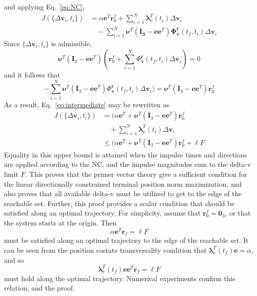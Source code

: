 \documentclass[letterpaper, 10 pt, conference]{ieeeconf}  %
\begin{document}
and applying Eq.~\eqref{eq:NC}, \begin{align}J(\{\Delta \boldsymbol{v}_i, t_i\}) &=  \alpha \boldsymbol{e}^T\boldsymbol{r}_0^f + \sum_{i = 1}^N \boldsymbol{\lambda}_v^T(t_i) \Delta \boldsymbol{v}_i \nonumber \\ &\quad - \sum_{i=1}^N \boldsymbol{\nu}^T(\boldsymbol{I_3} - \boldsymbol{e}\boldsymbol{e}^T)\boldsymbol{\Phi_v^r}(t_f, t_i) \Delta \boldsymbol{v}_i \label{eq:intermediate} \end{align} Since $\{\Delta \boldsymbol{v}_i, t_i \}$ is admissible, \[ \boldsymbol{\nu}^T(\boldsymbol{I}_3 - \boldsymbol{e}\boldsymbol{e}^T)(\boldsymbol{r}_0^f +\sum_{i=1}^N \Phi_{\boldsymbol{v}}^{\boldsymbol{r}}(t_f, t_i) \Delta \boldsymbol{v}_i )= 0    \] and it follows that \[ -\sum_{i=1}^N \boldsymbol{\nu}^T(\boldsymbol{I}_3 - \boldsymbol{e}\boldsymbol{e}^T) \Phi_{\boldsymbol{v}}^{\boldsymbol{r}}(t_f, t_i) \Delta \boldsymbol{v}_i ) = \boldsymbol{\nu}^T(\boldsymbol{I}_3 - \boldsymbol{e}\boldsymbol{e}^T)\boldsymbol{r}_0^f \]
As a result, Eq.~\eqref{eq:intermediate} may be rewritten as \begin{align}
    J(\{\Delta \boldsymbol{v}_i, t_i\}) &= (\alpha \boldsymbol{e}^T + \boldsymbol{\nu}^T(\boldsymbol{I}_3 - \boldsymbol{e}\boldsymbol{e}^T)\boldsymbol{r}_0^f \nonumber \\ &\quad + \sum_{i=1}^N\boldsymbol{\lambda}_v^T(t_i) \Delta\boldsymbol{v}_i \nonumber \\ 
    \quad &\leq (\alpha \boldsymbol{e}^T + \boldsymbol{\nu}^T(\boldsymbol{I}_3 - \boldsymbol{e}\boldsymbol{e}^T)\boldsymbol{r}_0^f + \ell F
\end{align} Equality in this upper bound is attained when the impulse times and directions are applied according to the NC, and the impulse magnitudes sum to the delta-v limit $F$. This proves that the primer vector theory give a sufficient condition for the linear directionally constrained terminal position norm maximization, and also proves that all available delta-v must be utilized to get to the edge of the reachable set. Further, this proof provides a scalar condition that should be satisfied along an optimal trajectory. For simplicity, assume that $\boldsymbol{r}_0^f = \boldsymbol{0}_3$, or that the system starts at the origin. Then \[\alpha \boldsymbol{e}^T\boldsymbol{r}_f = \ell F\] must be satisfied along an optimal trajectory to the edge of the reachable set. It can be seen from the position costate transversality condition that $\boldsymbol{\lambda}_r^T(t_f)\boldsymbol{e} = \alpha$, and so \begin{equation}
    \boldsymbol{\lambda}_r^T(t_f)\boldsymbol{e}\boldsymbol{e}^T\boldsymbol{r}_f = \ell F
\end{equation} must hold along the optimal trajectory. Numerical experiments confirm this relation, and the proof. 
\end{document}
